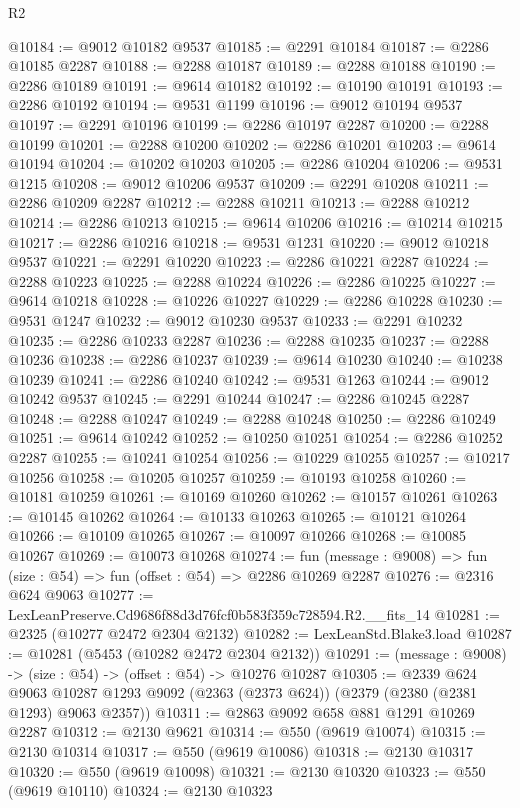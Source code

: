 \begin{lexlean}{R2}
\begin{coremodule}
@10184 := @9012 @10182 @9537
@10185 := @2291 @10184
@10187 := @2286 @10185 @2287
@10188 := @2288 @10187
@10189 := @2288 @10188
@10190 := @2286 @10189
@10191 := @9614 @10182
@10192 := @10190 @10191
@10193 := @2286 @10192
@10194 := @9531 @1199
@10196 := @9012 @10194 @9537
@10197 := @2291 @10196
@10199 := @2286 @10197 @2287
@10200 := @2288 @10199
@10201 := @2288 @10200
@10202 := @2286 @10201
@10203 := @9614 @10194
@10204 := @10202 @10203
@10205 := @2286 @10204
@10206 := @9531 @1215
@10208 := @9012 @10206 @9537
@10209 := @2291 @10208
@10211 := @2286 @10209 @2287
@10212 := @2288 @10211
@10213 := @2288 @10212
@10214 := @2286 @10213
@10215 := @9614 @10206
@10216 := @10214 @10215
@10217 := @2286 @10216
@10218 := @9531 @1231
@10220 := @9012 @10218 @9537
@10221 := @2291 @10220
@10223 := @2286 @10221 @2287
@10224 := @2288 @10223
@10225 := @2288 @10224
@10226 := @2286 @10225
@10227 := @9614 @10218
@10228 := @10226 @10227
@10229 := @2286 @10228
@10230 := @9531 @1247
@10232 := @9012 @10230 @9537
@10233 := @2291 @10232
@10235 := @2286 @10233 @2287
@10236 := @2288 @10235
@10237 := @2288 @10236
@10238 := @2286 @10237
@10239 := @9614 @10230
@10240 := @10238 @10239
@10241 := @2286 @10240
@10242 := @9531 @1263
@10244 := @9012 @10242 @9537
@10245 := @2291 @10244
@10247 := @2286 @10245 @2287
@10248 := @2288 @10247
@10249 := @2288 @10248
@10250 := @2286 @10249
@10251 := @9614 @10242
@10252 := @10250 @10251
@10254 := @2286 @10252 @2287
@10255 := @10241 @10254
@10256 := @10229 @10255
@10257 := @10217 @10256
@10258 := @10205 @10257
@10259 := @10193 @10258
@10260 := @10181 @10259
@10261 := @10169 @10260
@10262 := @10157 @10261
@10263 := @10145 @10262
@10264 := @10133 @10263
@10265 := @10121 @10264
@10266 := @10109 @10265
@10267 := @10097 @10266
@10268 := @10085 @10267
@10269 := @10073 @10268
@10274 := fun (message : @9008) => fun (size : @54) => fun (offset : @54) => @2286 @10269 @2287
@10276 := @2316 @624 @9063
@10277 := LexLeanPreserve.Cd9686f88d3d76fcf0b583f359c728594.R2.__fits_14
@10281 := @2325 (@10277 @2472 @2304 @2132)
@10282 := LexLeanStd.Blake3.load
@10287 := @10281 (@5453 (@10282 @2472 @2304 @2132))
@10291 := (message : @9008) -> (size : @54) -> (offset : @54) -> @10276 @10287
@10305 := @2339
    @624
    @9063
    @10287
    @1293
    @9092
    (@2363 (@2373 @624))
    (@2379 (@2380 (@2381 @1293) @9063 @2357))
@10311 := @2863 @9092 @658 @881 @1291 @10269 @2287
@10312 := @2130 @9621
@10314 := @550 (@9619 @10074)
@10315 := @2130 @10314
@10317 := @550 (@9619 @10086)
@10318 := @2130 @10317
@10320 := @550 (@9619 @10098)
@10321 := @2130 @10320
@10323 := @550 (@9619 @10110)
@10324 := @2130 @10323

\end{coremodule}
\end{lexlean}
